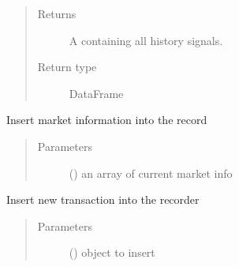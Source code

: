 \documentclass[letterpaper,10pt,english]{sphinxmanual}
\begin{document}
\begin{fulllineitems}
\begin{fulllineitems}
\begin{quote}
\begin{description}
\item[{Returns}] \leavevmode
\sphinxAtStartPar
A  containing all history signals.

\item[{Return type}] \leavevmode
\sphinxAtStartPar
DataFrame

\end{description}\end{quote}

\end{fulllineitems}


\begin{fulllineitems}
\label{\detokenize{Recorder:crypto_env.recorder.Recorder.insert_info}}
\sphinxAtStartPar
Insert market information into the record
\begin{quote}\begin{description}
\item[{Parameters}] \leavevmode
\sphinxAtStartPar
{} () \textendash{} an array of current market info

\end{description}\end{quote}

\end{fulllineitems}


\begin{fulllineitems}
\label{\detokenize{Recorder:crypto_env.recorder.Recorder.insert_transaction}}
\sphinxAtStartPar
Insert new transaction into the recorder
\begin{quote}\begin{description}
\item[{Parameters}] \leavevmode
\sphinxAtStartPar
{} () \textendash{}  object to insert


\end{description}
\end{quote}
\end{fulllineitems}
\end{fulllineitems}
\end{document}

